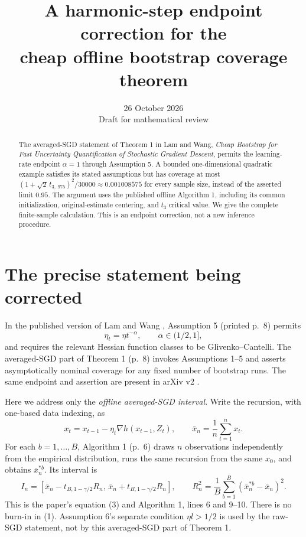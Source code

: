 \documentclass[11pt]{article}
\title{A harmonic-step endpoint correction for the\\cheap offline bootstrap coverage theorem}
\author{}
\date{26 October 2026\\\small Draft for mathematical review}
\begin{document}
\maketitle
\vspace{-1.5em}
\begin{abstract}
The averaged-SGD statement of Theorem 1 in Lam and Wang,
\emph{Cheap Bootstrap for Fast Uncertainty Quantification of Stochastic
Gradient Descent}, permits the learning-rate endpoint $\alpha=1$ through
Assumption 5. A bounded one-dimensional quadratic example satisfies its
stated assumptions but has coverage at most
$(1+\sqrt2\,t_{3,.975})^2/30000\approx0.001008575$ for every sample size,
instead of the asserted limit $0.95$. The argument uses the published
offline Algorithm 1, including its common initialization, original-estimate
centering, and $t_3$ critical value. We give the complete finite-sample
calculation. This is an endpoint correction, not a new inference procedure.
\end{abstract}

\section{The precise statement being corrected}

In the published version of Lam and Wang \cite{LW}, Assumption 5
(printed p.~8) permits
\[
 \eta_t=\eta t^{-\alpha},\qquad \alpha\in(1/2,1],
\]
and requires the relevant Hessian function classes to be
Glivenko--Cantelli. The averaged-SGD part of Theorem 1 (p.~8) invokes
Assumptions 1--5 and asserts asymptotically nominal coverage for any fixed
number of bootstrap runs. The same endpoint and assertion are present in
arXiv v2 \cite{LWv2}.

Here we address only the \emph{offline averaged-SGD interval}.
Write the recursion, with one-based data indexing, as
\[
 x_t=x_{t-1}-\eta_t\nabla h(x_{t-1},Z_t),\qquad
 \bar x_n=\frac1n\sum_{t=1}^n x_t.
 \tag{1}
\]
For each $b=1,\ldots,B$, Algorithm 1 (p.~6) draws $n$ observations
independently from the empirical distribution, runs the same recursion
from the same $x_0$, and obtains $\bar x_n^{*b}$. Its interval is
\[
 I_n=\left[\bar x_n-t_{B,1-\gamma/2}R_n,\,
                 \bar x_n+t_{B,1-\gamma/2}R_n\right],
 \qquad
 R_n^2=\frac1B\sum_{b=1}^B(\bar x_n^{*b}-\bar x_n)^2 .
 \tag{2}
\]
This is the paper's equation (3) and Algorithm 1, lines 6 and 9--10.
There is no burn-in in (1). Assumption 6's separate condition
$\eta l>1/2$ is used by the raw-SGD statement, not by this averaged-SGD
part of Theorem 1.
\end{document}
